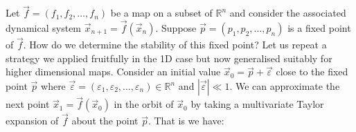 \documentclass[
  a4paper,
  oneside,
  final]{krantz}
\newcommand{\R}{\mathbb{R}}
\renewcommand{\epsilon}{\varepsilon}
\theoremstyle{definition}
\theoremstyle{definition}
\theoremstyle{definition}
\theoremstyle{definition}
\theoremstyle{remark}
\begin{document}
Let \(\vec{f} = (f_1, f_2, \ldots, f_n)\) be a map on a subset of \(\R^n\) and consider the associated dynamical system \(\vec{x}_{n+1} = \vec{f}(\vec{x}_n)\). Suppose \(\vec{p} = (p_1, p_2, \ldots, p_n)\) is a fixed point of \(\vec{f}\). How do we determine the stability of this fixed point? Let us repeat a strategy we applied fruitfully in the 1D case but now generalised suitably for higher dimensional maps. Consider an initial value \(\vec{x}_0 = \vec{p} + \vec{\epsilon}\) close to the fixed point \(\vec{p}\) where \(\vec{\epsilon} = (\epsilon_1, \epsilon_2, \ldots, \epsilon_{n}) \in \R^{n}\) and \(|\vec{\epsilon}| \ll 1\). We can approximate the next point \(\vec{x}_{1} = \vec{f}(\vec{x}_0)\) in the orbit of \(\vec{x}_0\) by taking a multivariate Taylor expansion of \(\vec{f}\) about the point \(\vec{p}\). That is we have:
\end{document}
